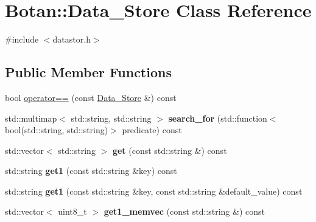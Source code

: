 \hypertarget{class_botan_1_1_data___store}{}\section{Botan\+:\+:Data\+\_\+\+Store Class Reference}
\label{class_botan_1_1_data___store}


{\ttfamily \#include $<$datastor.\+h$>$}

\subsection*{Public Member Functions}
\begin{DoxyCompactItemize}
\item 
bool \hyperlink{class_botan_1_1_data___store_a8c889aa5cbadc64821c72e77f3a6a19c}{operator==} (const \hyperlink{class_botan_1_1_data___store}{Data\+\_\+\+Store} \&) const
\item 
\mbox{\label{class_botan_1_1_data___store_af61274aff87a4c7424584abc14c7117e}} 
std\+::multimap$<$ std\+::string, std\+::string $>$ {\bfseries search\+\_\+for} (std\+::function$<$ bool(std\+::string, std\+::string)$>$ predicate) const
\item 
\mbox{\label{class_botan_1_1_data___store_aeb7e86dfddc2f57d012a530ff420f275}} 
std\+::vector$<$ std\+::string $>$ {\bfseries get} (const std\+::string \&) const
\item 
\mbox{\label{class_botan_1_1_data___store_aca669033de873b643cf1e96c9948db1b}} 
std\+::string {\bfseries get1} (const std\+::string \&key) const
\item 
\mbox{\label{class_botan_1_1_data___store_a7dca4cdf6f18b8e681232965aaeccc09}} 
std\+::string {\bfseries get1} (const std\+::string \&key, const std\+::string \&default\+\_\+value) const
\item 
\mbox{\label{class_botan_1_1_data___store_aba0d9b8c1b96cb0f36f37ae77c214b68}} 
std\+::vector$<$ uint8\+\_\+t $>$ {\bfseries get1\+\_\+memvec} (const std\+::string \&) const
\item 
\mbox{\label{class_botan_1_1_data___store_a0434c97f8d94f7a804bf36bda9c165d9}} 

\end{DoxyCompactItemize}
